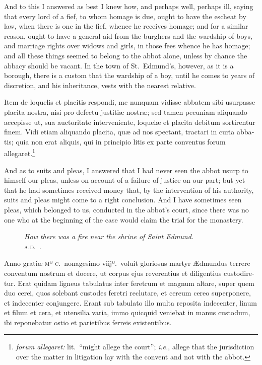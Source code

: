 \documentclass{book}
\newcommand{\blockhead}[4][]{
\begin{figure}
\centering
\vspace{#4}
\parbox{2.75cm}{\begin{center}\footnotesize \color{BrickRed} \emph{#2}\\ #1 \end{center}}
\end{figure}
}
\begin{document}
\begin{paracol}{2}
\switchcolumn

And to this I answered as best I knew how, and perhaps well, perhaps ill, saying that every lord of a fief, to whom homage is due, ought to have the escheat by law, when there is one in the fief, whence he receives homage; and for a similar reason, ought to have a general aid from the burghers and the wardship of boys, and marriage rights over widows and girls, in those fees whence he has homage; and all these things seemed to belong to the abbot alone, unless by chance the abbacy should be vacant. In the town of St.\ Edmund's, however, as it is a borough, there is a custom that the wardship of a boy, until he comes to years of discretion, and his inheritance, vests with the nearest relative.

\switchcolumn*

\begin{otherlanguage}{latin}
Item de loquelis et placitis respondi, me nunquam vidisse abbatem sibi usurpasse placita nostra, nisi pro defectu justiti\ae{} nostr\ae{}; sed tamen pecuniam aliquando accepisse ut, sua auctoritate interveniente, loquel\ae{} et placita debitum sortirentur finem. Vidi etiam aliquando placita, qu\ae{} ad nos spectant, tractari in curia abbatis; quia non erat aliquis, qui in principio litis ex parte conventus forum allegaret.\footnote[\textdagger]{\emph{forum allegaret:} lit.\ ``might allege the court''; \emph{i.e.}, allege that the jurisdiction over the matter in litigation lay with the convent and not with the abbot.}
\end{otherlanguage}

\switchcolumn

And as to suits and pleas, I answered that I had never seen the abbot usurp to himself our pleas, unless on account of a failure of justice on our part; but yet that he had sometimes received money that, by the intervention of his authority, suits and pleas might come to a right conclusion. And I have sometimes seen pleas, which belonged to us, conducted in the abbot's court, since there was no one who at the beginning of the case would claim the trial for the monastery.

\switchcolumn*

\begin{otherlanguage}{latin}
\blockhead[\textsc{a.d}.\ .]{How there was a fire near the shrine of Saint Edmund.}{4}{-.55cm}
Anno grati\ae{} \textsc{mº c}.\ nonagesimo viijº.\ voluit gloriosus martyr \AE{}dmundus terrere conventum nostrum et docere, ut corpus ejus reverentius et diligentius custodiretur. Erat quidam ligneus tabulatus inter feretrum et magnum altare, super quem duo cerei, quos solebant custodes feretri reclutare, et cereum cereo superponere, et indecenter conjungere. Erant sub tabulato illo multa reposita indecenter, linum et filum et cera, et utensilia varia, immo quicquid veniebat in manus custodum, ibi reponebatur ostio et parietibus ferreis existentibus.


\end{otherlanguage}
\end{paracol}
\end{document}
